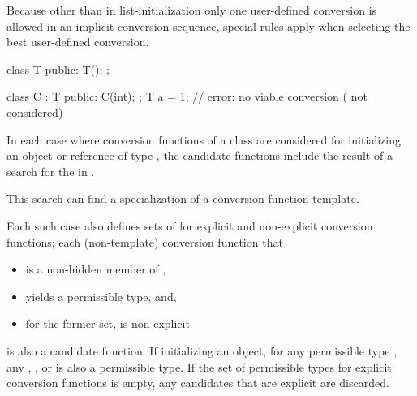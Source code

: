 \pnum
Because other than in list-initialization only one user-defined conversion
is allowed
in an
implicit conversion sequence, special rules apply when selecting
the best user-defined conversion.
\begin{example}
\begin{codeblock}
class T {
public:
  T();
};

class C : T {
public:
  C(int);
};
T a = 1;            // error: no viable conversion ( not considered)
\end{codeblock}
\end{example}

\pnum
In each case where conversion functions of a class  are considered
for initializing an object or reference of type ,
the candidate functions include the result of a search
for the  
in .
\begin{note}
This search can find a specialization of
a conversion function template.
\end{note}
Each such case also defines sets of 
for explicit and non-explicit conversion functions;
each (non-template) conversion function
that
\begin{itemize}
\item is a non-hidden member of ,
\item yields a permissible type, and,
\item for the former set, is non-explicit
\end{itemize}
is also a candidate function.
If initializing an object, for any permissible type \cv{} , any
 ,  , or  
is also a permissible type.
If the set of permissible types for explicit conversion functions is empty,
any candidates that are explicit are discarded.

